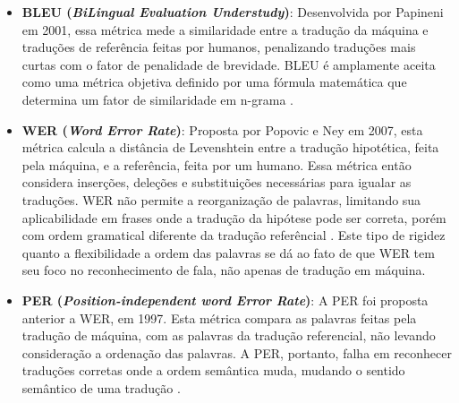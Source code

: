 \begin{itemize}
\item \textbf{BLEU (\textit{BiLingual Evaluation Understudy})}: Desenvolvida por Papineni em 2001, essa métrica mede a similaridade entre a tradução da máquina e traduções de referência feitas por humanos, penalizando traduções mais curtas com o fator de penalidade de brevidade. BLEU é amplamente aceita como uma métrica objetiva definido por uma fórmula matemática que determina um fator de similaridade em n-grama \cite[p. 167]{cheragui}.

    
\item \textbf{WER (\textit{Word Error Rate})}: Proposta por Popovic e Ney em 2007, esta métrica calcula a distância de Levenshtein entre a tradução hipotética, feita pela máquina, e a referência, feita por um humano. Essa métrica então considera inserções, deleções e substituições necessárias para igualar as traduções. WER não permite a reorganização de palavras, limitando sua aplicabilidade em frases onde a tradução da hipótese pode ser correta, porém com ordem gramatical diferente da tradução referêncial \cite[p. 167]{cheragui}. Este tipo de rigidez quanto a flexibilidade a ordem das palavras se dá ao fato de que WER tem seu foco no reconhecimento de fala, não apenas de tradução em máquina.

    

    
\item \textbf{PER (\textit{Position-independent word Error Rate})}: A PER foi proposta anterior a WER, em 1997. Esta métrica compara as palavras feitas pela tradução de máquina, com as palavras da tradução referencial, não levando consideração a ordenação das palavras. A PER, portanto, falha em reconhecer traduções corretas onde a ordem semântica muda, mudando o sentido semântico de uma tradução \cite[p. 168]{cheragui}.


\end{itemize}
